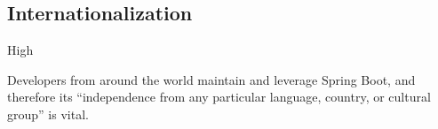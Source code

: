 \subsection*{Internationalization}

\ranking High

Developers from around the world maintain and leverage Spring Boot, and therefore its \enquote{independence from any particular language, country, or cultural group} \cite{rw2012} is vital.